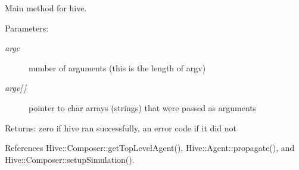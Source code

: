 Main method for hive.

\begin{Desc}
\item[Parameters:]
\begin{description}
\item[{\em argc}]number of arguments (this is the length of argv) \item[{\em argv\mbox{[}$\,$\mbox{]}}]pointer to char arrays (strings) that were passed as arguments \end{description}
\end{Desc}
\begin{Desc}
\item[Returns:]zero if hive ran successfully, an error code if it did not \end{Desc}


References Hive::Composer::getTopLevelAgent(), Hive::Agent::propagate(), and Hive::Composer::setupSimulation().